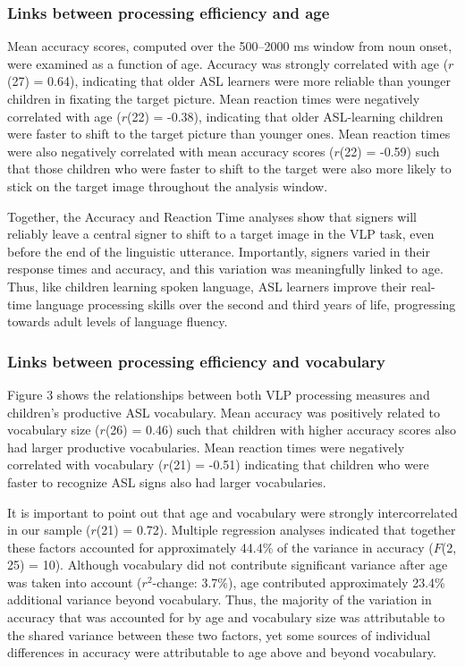 \documentclass[12pt,]{article}
\begin{document}
\subsubsection{Links between processing efficiency and
age}\label{links-between-processing-efficiency-and-age}

Mean accuracy scores, computed over the 500--2000 ms window from noun
onset, were examined as a function of age. Accuracy was strongly
correlated with age (\(r\)(27) = 0.64), indicating that older ASL
learners were more reliable than younger children in fixating the target
picture. Mean reaction times were negatively correlated with age
(\(r\)(22) = -0.38), indicating that older ASL-learning children were
faster to shift to the target picture than younger ones. Mean reaction
times were also negatively correlated with mean accuracy scores
(\(r\)(22) = -0.59) such that those children who were faster to shift to
the target were also more likely to stick on the target image throughout
the analysis window.

Together, the Accuracy and Reaction Time analyses show that signers will
reliably leave a central signer to shift to a target image in the VLP
task, even before the end of the linguistic utterance. Importantly,
signers varied in their response times and accuracy, and this variation
was meaningfully linked to age. Thus, like children learning spoken
language, ASL learners improve their real-time language processing
skills over the second and third years of life, progressing towards
adult levels of language fluency.

\subsubsection{Links between processing efficiency and
vocabulary}\label{links-between-processing-efficiency-and-vocabulary}

Figure 3 shows the relationships between both VLP processing measures
and children's productive ASL vocabulary. Mean accuracy was positively
related to vocabulary size (\(r\)(26) = 0.46) such that children with
higher accuracy scores also had larger productive vocabularies. Mean
reaction times were negatively correlated with vocabulary (\(r\)(21) =
-0.51) indicating that children who were faster to recognize ASL signs
also had larger vocabularies.

It is important to point out that age and vocabulary were strongly
intercorrelated in our sample (\(r\)(21) = 0.72). Multiple regression
analyses indicated that together these factors accounted for
approximately 44.4\% of the variance in accuracy (\(F\)(2, 25) = 10).
Although vocabulary did not contribute significant variance after age
was taken into account (\(r^2\)-change: 3.7\%), age contributed
approximately 23.4\% additional variance beyond vocabulary. Thus, the
majority of the variation in accuracy that was accounted for by age and
vocabulary size was attributable to the shared variance between these
two factors, yet some sources of individual differences in accuracy were
attributable to age above and beyond vocabulary.
\end{document}
